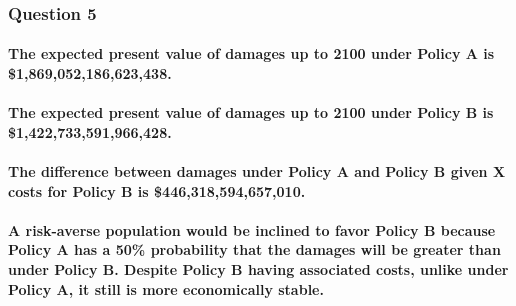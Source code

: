 \documentclass[
]{article}
\begin{document}
\hypertarget{question-5}{%
\subsubsection{Question 5}\label{question-5}}

\hypertarget{the-expected-present-value-of-damages-up-to-2100-under-policy-a-is-1869052186623438.}{%
\paragraph{The expected present value of damages up to 2100 under Policy
A is
\$1,869,052,186,623,438.}\label{the-expected-present-value-of-damages-up-to-2100-under-policy-a-is-1869052186623438.}}

\hypertarget{the-expected-present-value-of-damages-up-to-2100-under-policy-b-is-1422733591966428.}{%
\paragraph{The expected present value of damages up to 2100 under Policy
B is
\$1,422,733,591,966,428.}\label{the-expected-present-value-of-damages-up-to-2100-under-policy-b-is-1422733591966428.}}

\hypertarget{the-difference-between-damages-under-policy-a-and-policy-b-given-x-costs-for-policy-b-is-446318594657010.}{%
\paragraph{The difference between damages under Policy A and Policy B
given X costs for Policy B is
\$446,318,594,657,010.}\label{the-difference-between-damages-under-policy-a-and-policy-b-given-x-costs-for-policy-b-is-446318594657010.}}

\hypertarget{a-risk-averse-population-would-be-inclined-to-favor-policy-b-because-policy-a-has-a-50-probability-that-the-damages-will-be-greater-than-under-policy-b.-despite-policy-b-having-associated-costs-unlike-under-policy-a-it-still-is-more-economically-stable.}{%
\paragraph{A risk-averse population would be inclined to favor Policy B
because Policy A has a 50\% probability that the damages will be greater
than under Policy B. Despite Policy B having associated costs, unlike
under Policy A, it still is more economically
stable.}\label{a-risk-averse-population-would-be-inclined-to-favor-policy-b-because-policy-a-has-a-50-probability-that-the-damages-will-be-greater-than-under-policy-b.-despite-policy-b-having-associated-costs-unlike-under-policy-a-it-still-is-more-economically-stable.}}
\end{document}

